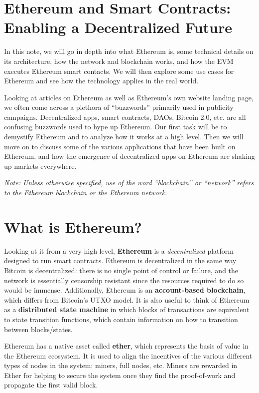 \documentclass[full.tex]{subfiles}
\begin{document}
    \thispagestyle{firstpage}
    \vspace*{2\baselineskip}
    \section*{Ethereum and Smart Contracts: Enabling a Decentralized Future}
    
    In this note, we will go in depth into what Ethereum is, some technical details on its architecture, how the network and blockchain works, and how the EVM executes Ethereum smart contacts. We will then explore some use cases for Ethereum and see how the technology applies in the real world.
    
    Looking at articles on Ethereum as well as Ethereum's own website landing page, we often come across a plethora of ``buzzwords'' primarily used in publicity campaigns. Decentralized apps, smart contracts, DAOs, Bitcoin 2.0, etc. are all confusing buzzwords used to hype up Ethereum. Our first task will be to demystify Ethereum and to analyze how it works at a high level. Then we will move on to discuss some of the various applications that have been built on Ethereum, and how the emergence of decentralized apps on Ethereum are shaking up markets everywhere.
        
    
    \textit{Note: Unless otherwise specified, use of the word ``blockchain'' or ``network'' refers to the Ethereum blockchain or the Ethereum network.}
    
    \section*{What is Ethereum?}
    
    Looking at it from a very high level, \textbf{Ethereum} is a \textit{decentralized} platform designed to run smart contracts. Ethereum is decentralized in the same way Bitcoin is decentralized: there is no single point of control or failure, and the network is essentially censorship resistant since the resources required to do so would be immense. Additionally, Ethereum is an \textbf{account-based blockchain}, which differs from Bitcoin's UTXO model. It is also useful to think of Ethereum as a \textbf{distributed state machine} in which blocks of transactions are equivalent to state transition functions, which contain information on how to transition between blocks/states.
    
    Ethereum has a native asset called \textbf{ether}, which represents the basis of value in the Ethereum ecosystem. It is used to align the incentives of the various different types of nodes in the system: miners, full nodes, etc. Miners are rewarded in Ether for helping to secure the system once they find the proof-of-work and propagate the first valid block. 
    
\end{document}
